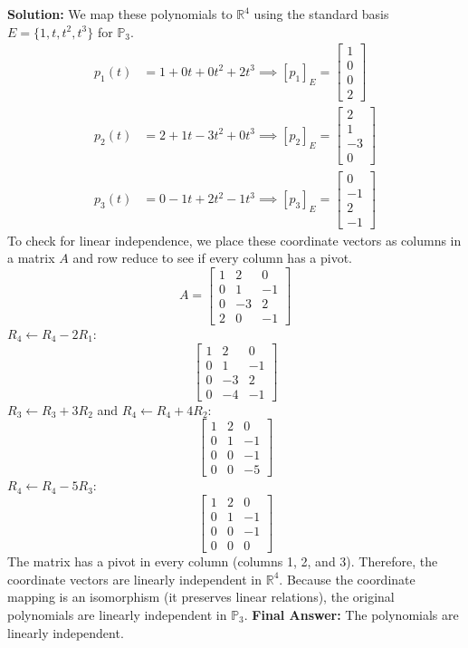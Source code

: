 \documentclass[11pt]{article}
\begin{document}
\textbf{Solution:}
We map these polynomials to $\mathbb{R}^4$ using the standard basis $E = \{1, t, t^2, t^3\}$ for $\mathbb{P}_3$.
\begin{align*}
p_1(t) &= 1 + 0t + 0t^2 + 2t^3 \implies [p_1]_E = \begin{bmatrix} 1 \\ 0 \\ 0 \\ 2 \end{bmatrix} \\
p_2(t) &= 2 + 1t - 3t^2 + 0t^3 \implies [p_2]_E = \begin{bmatrix} 2 \\ 1 \\ -3 \\ 0 \end{bmatrix} \\
p_3(t) &= 0 - 1t + 2t^2 - 1t^3 \implies [p_3]_E = \begin{bmatrix} 0 \\ -1 \\ 2 \\ -1 \end{bmatrix}
\end{align*}
To check for linear independence, we place these coordinate vectors as columns in a matrix $A$ and row reduce to see if every column has a pivot.
\[ A = \begin{bmatrix} 1 & 2 & 0 \\ 0 & 1 & -1 \\ 0 & -3 & 2 \\ 2 & 0 & -1 \end{bmatrix} \]
$R_4 \leftarrow R_4 - 2R_1$:
\[ \begin{bmatrix} 1 & 2 & 0 \\ 0 & 1 & -1 \\ 0 & -3 & 2 \\ 0 & -4 & -1 \end{bmatrix} \]
$R_3 \leftarrow R_3 + 3R_2$ and $R_4 \leftarrow R_4 + 4R_2$:
\[ \begin{bmatrix} 1 & 2 & 0 \\ 0 & 1 & -1 \\ 0 & 0 & -1 \\ 0 & 0 & -5 \end{bmatrix} \]
$R_4 \leftarrow R_4 - 5R_3$:
\[ \begin{bmatrix} 1 & 2 & 0 \\ 0 & 1 & -1 \\ 0 & 0 & -1 \\ 0 & 0 & 0 \end{bmatrix} \]
The matrix has a pivot in every column (columns 1, 2, and 3). Therefore, the coordinate vectors are linearly independent in $\mathbb{R}^4$. Because the coordinate mapping is an isomorphism (it preserves linear relations), the original polynomials are linearly independent in $\mathbb{P}_3$.
\textbf{Final Answer:} The polynomials are linearly independent.
\end{document}
